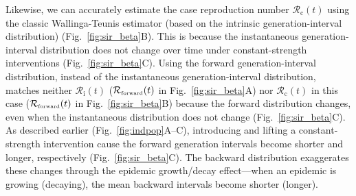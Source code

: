 \documentclass[12pt]{article}
\newcommand{\fref}[1]{Fig.~\ref{fig:#1}}
\newcommand{\Rx}[1]{\ensuremath{{\mathcal R}_{#1}}\xspace}
\newcommand{\Rc}{\Rx{\mathrm{c}}}
\newcommand{\Ri}{\Rx{\mathrm{i}}}
\newcommand{\RR}{\ensuremath{{\mathcal R}}\xspace}
\newcommand{\tsub}[2]{#1_{{\textrm{\tiny #2}}}}
\begin{document}
Likewise, we can accurately estimate the case reproduction number $\Rc(t)$ using the classic Wallinga-Teunis estimator (based on the intrinsic generation-interval distribution) (\fref{sir_beta}B).
This is because the instantaneous generation-interval distribution does not change over time under constant-strength interventions (\fref{sir_beta}C).
Using the forward generation-interval distribution, instead of the instantaneous generation-interval distribution, matches neither $\Ri(t)$ ($\tsub{\RR}{forward}(t)$ in \fref{sir_beta}A) nor $\Rc(t)$ in this case ($\tsub{\RR}{forward}(t)$ in \fref{sir_beta}B) because the forward distribution changes, even when the instantaneous distribution does not change (\fref{sir_beta}C).
As described earlier (\fref{indpop}A--C), introducing and lifting a constant-strength intervention cause the forward generation intervals become shorter and longer, respectively (\fref{sir_beta}C).
The backward distribution exaggerates these changes through the epidemic growth/decay effect---when an epidemic is growing (decaying), the mean backward intervals become shorter (longer).
\end{document}
